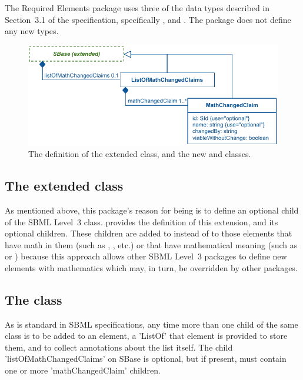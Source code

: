 The Required Elements package uses three of the data types described in Section~3.1 of the \sbmlthreecore specification, specifically ,  and .  The package does not define any new types.


\begin{figure}[bh]
  \includegraphics{figs/extended-sbase-req-uml}
  \vspace*{-0.0em}
  \caption{The definition of the extended \SBase class, and the new \ListOfMathChangedClaims and \MathChangedClaim classes.}
  \label{extended-sbase-uml}
\end{figure}

\subsection{The extended  class}
\label{extended-sbase-class}

As mentioned above, this package's reason for being is to define an optional child of the SBML Level~3 \SBase class.   provides the definition of this \SBase extension, and its optional \MathChangedClaim children.  These children are added to \SBase instead of to those elements that have math in them (such as \InitialAssignment, \KineticLaw, etc.) or that have mathematical meaning (such as \Parameter or \Species) because this approach allows other SBML Level~3 packages to define new elements with mathematics which may, in turn, be overridden by other packages.

\subsection{The  class}
\label{listofmathchangedclaims-class}

As is standard in SBML specifications, any time more than one child of the same class is to be added to an element, a 'ListOf' that element is provided to store them, and to collect annotations about the list itself.  The child 'listOfMathChangedClaims' on SBase is optional, but if present, must contain one or more 'mathChangedClaim' children.

